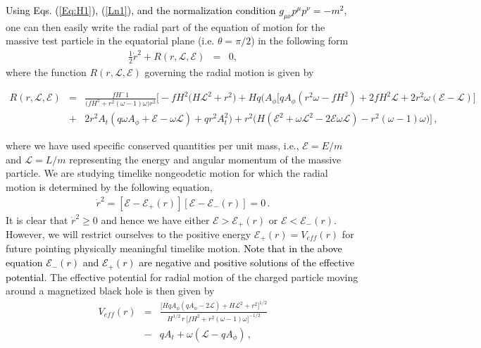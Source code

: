 \documentclass[showpacs,twocolumn,superscriptaddress]{revtex4}
\begin{document}
\textcolor{black}{Using Eqs. (\ref{Eq:H1}), (\ref{Ln1}), and the normalization condition $g_{\mu\nu}p^{\mu}p^{\nu}=-m^2$}, one can then easily write the radial part of the equation of motion for the massive test particle in the equatorial plane (i.e. $\theta=\pi/2$) in the following form 
%
\begin{eqnarray}
\frac{1}{2}\dot{r}^{2} + R(r,\mathcal{L},\mathcal{E}) &=&0,
\end{eqnarray}
where the function $ R(r,\mathcal{L},\mathcal{E})$ governing the radial motion is given by
%
\begin{widetext}
\begin{eqnarray}\label{Eq:Effective}
R(r,\mathcal{L},\mathcal{E})&=&\frac{fH^-1 }{ \Big(f H^2+r^2 (\omega -1) \omega \Big)r^2 }\bigg[-f H^2 \Big(H \mathcal{L}^2+ r^2\Big)+ H q \bigg(A_{\phi } \Big[q A_{\phi } \left(r^2 \omega -f H^2\right)+2 f H^2 \mathcal{L}+ 2 r^2 \omega  (\mathcal{E} -\mathcal{L})\Big] \nonumber\\ &+&  2 r^2 A_t \left(q \omega  A_{\phi }+\mathcal{E}-\omega  \mathcal{L}\right)+q r^2 A_t^2\bigg)+r^2 \bigg(H \left(\mathcal{E}^2+\omega  \mathcal{L}^2-2 \mathcal{E}  \omega  \mathcal{L}\right)- r^2 (\omega -1) \omega \bigg)\bigg]\, ,
\end{eqnarray}
\end{widetext}
where we have used specific conserved quantities per unit mass, i.e., $\mathcal{E}=E/m$ and
$\mathcal{L}=L/m$ representing the energy and angular momentum of the massive particle. We are studying timelike nongeodetic motion for which the radial motion is determined by the following equation,
\begin{eqnarray}
\dot{r}^{2} = \left[\mathcal{E} -
\mathcal{E_{+}}(r)\right]\left[\mathcal{E}
-\mathcal{E_{-}}(r)\right] = 0 \, .
\end{eqnarray}
%
It is clear that $\dot{r}^2\geq 0$ and hence we have either $\mathcal{E}>\mathcal{E}_{+}(r)$ or $\mathcal{E}<\mathcal{E}_{-}(r)$. However, we will restrict ourselves to the positive energy $\mathcal{E}_{+}(r)=V_{eff}(r)$ for future pointing physically meaningful timelike motion. \textcolor{black}{Note that in the above equation $\mathcal{E}_{-}(r)$ and $\mathcal{E}_{+}(r)$ are negative and positive solutions of the effective potential.} The effective potential for radial motion of the charged particle moving around a magnetized black hole is then given by
\begin{eqnarray}
V_{eff}(r)&=&\frac{\Big[H q A_{\phi } \left(q A_{\phi }-2 \mathcal{L}\right)+H \mathcal{L}^2+r^2\Big]^{1/2}}{H^{1/2}\, r\, \Big[f H^2+r^2 (\omega -1) \omega \Big]^{-1/2} }\nonumber\\&-& q A_t+\omega  \left(\mathcal{L}-q A_{\phi }\right)\, ,
\end{eqnarray}
\end{document}
